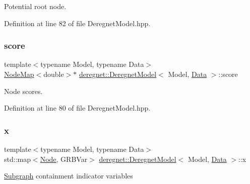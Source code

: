Potential root node. 



Definition at line 82 of file Deregnet\+Model.\+hpp.

\mbox{\label{classderegnet_1_1DeregnetModel_a46224b0bda5bab796d3b7cb41c184a4d}} 
\subsubsection{\texorpdfstring{score}{score}}
{\footnotesize\ttfamily template$<$typename Model, typename Data$>$ \\
\hyperlink{namespacederegnet_ae102b707ae1d6f83c639ece5e0dd5658}{Node\+Map}$<$double$>$$\ast$ \hyperlink{classderegnet_1_1DeregnetModel}{deregnet\+::\+Deregnet\+Model}$<$ Model, \hyperlink{avgdrgnt_8cpp_a1d1235306db276e9b36acba1db1509e8}{Data} $>$\+::score\hspace{0.3cm}{\ttfamily [protected]}}



Node scores. 



Definition at line 80 of file Deregnet\+Model.\+hpp.

\mbox{\label{classderegnet_1_1DeregnetModel_a360c980f3fec4dfbab50e9bb06a933a8}} 
\subsubsection{\texorpdfstring{x}{x}}
{\footnotesize\ttfamily template$<$typename Model, typename Data$>$ \\
std\+::map$<$\hyperlink{namespacederegnet_a744bad34f2de9856d36715a445f027f3}{Node}, G\+R\+B\+Var$>$ \hyperlink{classderegnet_1_1DeregnetModel}{deregnet\+::\+Deregnet\+Model}$<$ Model, \hyperlink{avgdrgnt_8cpp_a1d1235306db276e9b36acba1db1509e8}{Data} $>$\+::x\hspace{0.3cm}{\ttfamily [protected]}}



\textquotesingle{}\hyperlink{structderegnet_1_1Subgraph}{Subgraph} containment\textquotesingle{} indicator variables 



